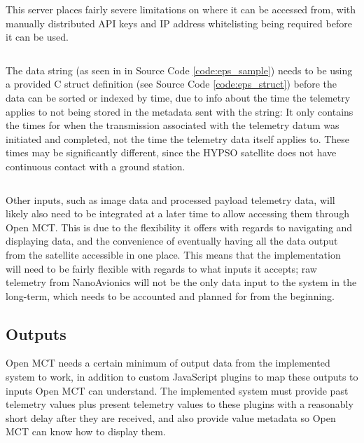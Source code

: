 This server places fairly severe limitations on where it can be accessed from, with manually distributed API keys and IP address whitelisting being required before it can be used.

\begin{code}
\inputminted[linenos=true,breaklines=true,bgcolor=codebg]{javascript}{./Code/eps_telemetry_sample_trimmed.json}
\label{code:eps_sample}
\end{code}

The data string (as seen in  in Source Code \ref{code:eps_sample}) needs to be  using a provided C \gls{struct} definition (see Source Code \ref{code:eps_struct}) before the data can be sorted or indexed by time, due to info about the time the telemetry applies to not being stored in the \gls{metadata} sent with the string: It only contains the times for when the transmission associated with the telemetry datum was initiated and completed, not the time the telemetry data itself applies to. These times may be significantly different, since the HYPSO satellite does not have continuous contact with a ground station.

\begin{code}
\inputminted[linenos=true,breaklines=true,bgcolor=codebg]{c}{./Code/eps_telemetry_struct_NAEPS001.txt}
\label{code:eps_struct}
\end{code}

Other inputs, such as image data and processed payload telemetry data, will likely also need to be integrated at a later time to allow accessing them through Open MCT. This is due to the flexibility it offers with regards to navigating and displaying data, and the convenience of eventually having all the data output from the satellite accessible in one place. This means that the implementation will need to be fairly flexible with regards to what inputs it accepts; raw telemetry from NanoAvionics will not be the only data input to the system in the long-term, which needs to be accounted and planned for from the beginning.

\subsection{Outputs}
Open MCT needs a certain minimum of output data from the implemented system to work, in addition to custom JavaScript plugins to map these outputs to inputs Open MCT can understand. The implemented system must provide past telemetry values plus present telemetry values to these plugins with a reasonably short delay after they are received, and also provide value \gls{metadata} so Open MCT can know how to display them.

